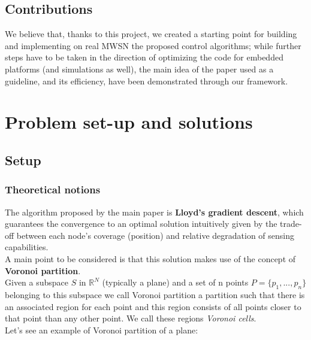 \documentclass[a4paper,11pt,oneside]{book}
\begin{document}
	
	\section*{Contributions}
	We believe that, thanks to this project, we created a starting point for building and implementing on real MWSN the proposed control algorithms; while further steps have to be taken in the direction of optimizing the code for embedded platforms (and simulations as well), the main idea of the paper used as a guideline, and its efficiency, have been demonstrated through our framework.
	
	
	\chapter{Problem set-up and solutions}
	
	
	\section{Setup}
	\subsection {Theoretical notions}
	
	The algorithm proposed by the main paper is \textbf{Lloyd's gradient descent}, which guarantees the convergence to an optimal solution intuitively given by the trade-off between each node's coverage (position) and relative degradation of sensing capabilities.\\
	A main point to be considered is that this solution makes use of the concept of \textbf{Voronoi partition}.\\
	Given a subspace $S$ in $\mathbb{R}^N$ (typically a plane) and a set of n points $P=\{p_1,...,p_n\}$ belonging to this subspace we call Voronoi partition a partition such that there is an associated region for each point and this region consists of all points closer to that point than any other point. We call these regions \emph{Voronoi cells}.\\
	Let's see an example of Voronoi partition of a plane:\\
	
\end{document}
